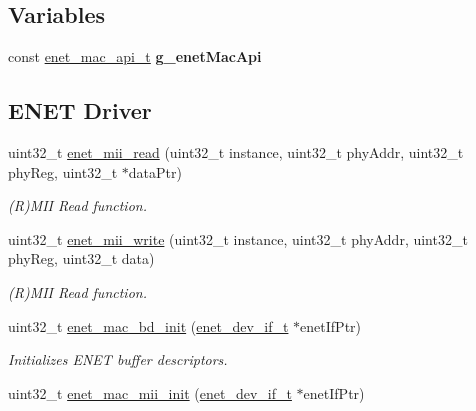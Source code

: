 \subsection*{Variables}
\begin{DoxyCompactItemize}
\item 
const \hyperlink{group__enet__driver_gab382bcb745b2f90606d85802d007108e}{enet\+\_\+mac\+\_\+api\+\_\+t} {\bfseries g\+\_\+enet\+Mac\+Api}\hypertarget{group__enet__driver_gabe68cd6fd0f8db89074331d7b026d9f7}{}\label{group__enet__driver_gabe68cd6fd0f8db89074331d7b026d9f7}

\end{DoxyCompactItemize}
\subsection*{E\+N\+ET Driver}
\begin{DoxyCompactItemize}
\item 
uint32\+\_\+t \hyperlink{group__enet__driver_gaa480bc7a883461c6b152d9df19aa32ab}{enet\+\_\+mii\+\_\+read} (uint32\+\_\+t instance, uint32\+\_\+t phy\+Addr, uint32\+\_\+t phy\+Reg, uint32\+\_\+t $\ast$data\+Ptr)
\begin{DoxyCompactList}\small\item\em (R)M\+II Read function. \end{DoxyCompactList}\item 
uint32\+\_\+t \hyperlink{group__enet__driver_ga847371cdd06f5bed49c55f8c44350dc5}{enet\+\_\+mii\+\_\+write} (uint32\+\_\+t instance, uint32\+\_\+t phy\+Addr, uint32\+\_\+t phy\+Reg, uint32\+\_\+t data)
\begin{DoxyCompactList}\small\item\em (R)M\+II Read function. \end{DoxyCompactList}\item 
uint32\+\_\+t \hyperlink{group__enet__driver_gac92e3b0f7042988539eef7cab90ea8ff}{enet\+\_\+mac\+\_\+bd\+\_\+init} (\hyperlink{group__enet__driver_ga497f30fbc93952e93d9fb8cf78480b75}{enet\+\_\+dev\+\_\+if\+\_\+t} $\ast$enet\+If\+Ptr)
\begin{DoxyCompactList}\small\item\em Initializes E\+N\+ET buffer descriptors. \end{DoxyCompactList}\item 
uint32\+\_\+t \hyperlink{group__enet__driver_ga36b5cf48392dc298e4675b2cc618c80a}{enet\+\_\+mac\+\_\+mii\+\_\+init} (\hyperlink{group__enet__driver_ga497f30fbc93952e93d9fb8cf78480b75}{enet\+\_\+dev\+\_\+if\+\_\+t} $\ast$enet\+If\+Ptr)

\end{DoxyCompactItemize}
